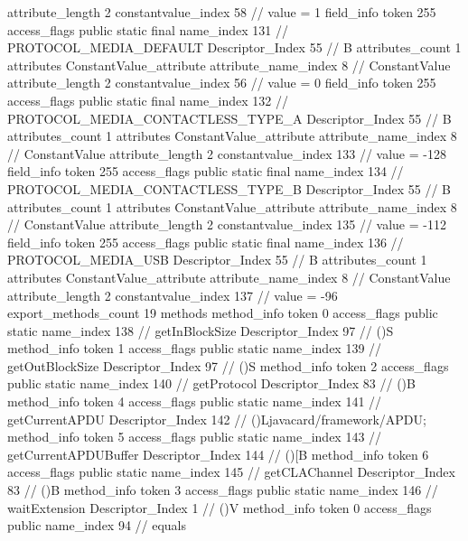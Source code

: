 {{{{{{{					attribute_length	2
					constantvalue_index	58		// value = 1
				}
				}
			}
			field_info {
				token	255
				access_flags	public static final
				name_index	131		// PROTOCOL_MEDIA_DEFAULT
				Descriptor_Index	55		// B
				attributes_count	1
				attributes {
				ConstantValue_attribute {
					attribute_name_index	8		// ConstantValue
					attribute_length	2
					constantvalue_index	56		// value = 0
				}
				}
			}
			field_info {
				token	255
				access_flags	public static final
				name_index	132		// PROTOCOL_MEDIA_CONTACTLESS_TYPE_A
				Descriptor_Index	55		// B
				attributes_count	1
				attributes {
				ConstantValue_attribute {
					attribute_name_index	8		// ConstantValue
					attribute_length	2
					constantvalue_index	133		// value = -128
				}
				}
			}
			field_info {
				token	255
				access_flags	public static final
				name_index	134		// PROTOCOL_MEDIA_CONTACTLESS_TYPE_B
				Descriptor_Index	55		// B
				attributes_count	1
				attributes {
				ConstantValue_attribute {
					attribute_name_index	8		// ConstantValue
					attribute_length	2
					constantvalue_index	135		// value = -112
				}
				}
			}
			field_info {
				token	255
				access_flags	public static final
				name_index	136		// PROTOCOL_MEDIA_USB
				Descriptor_Index	55		// B
				attributes_count	1
				attributes {
				ConstantValue_attribute {
					attribute_name_index	8		// ConstantValue
					attribute_length	2
					constantvalue_index	137		// value = -96
				}
				}
			}
			}
			export_methods_count	19
			methods {
				method_info {
					token	0
					access_flags	public static
					name_index	138		// getInBlockSize
					Descriptor_Index	97		// ()S
				}
				method_info {
					token	1
					access_flags	public static
					name_index	139		// getOutBlockSize
					Descriptor_Index	97		// ()S
				}
				method_info {
					token	2
					access_flags	public static
					name_index	140		// getProtocol
					Descriptor_Index	83		// ()B
				}
				method_info {
					token	4
					access_flags	public static
					name_index	141		// getCurrentAPDU
					Descriptor_Index	142		// ()Ljavacard/framework/APDU;
				}
				method_info {
					token	5
					access_flags	public static
					name_index	143		// getCurrentAPDUBuffer
					Descriptor_Index	144		// ()[B
				}
				method_info {
					token	6
					access_flags	public static
					name_index	145		// getCLAChannel
					Descriptor_Index	83		// ()B
				}
				method_info {
					token	3
					access_flags	public static
					name_index	146		// waitExtension
					Descriptor_Index	1		// ()V
				}
				method_info {
					token	0
					access_flags	public
					name_index	94		// equals
}}}}}

